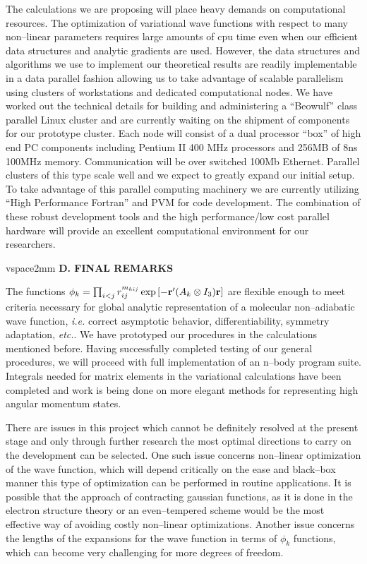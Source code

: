 The calculations we are proposing will place heavy demands on computational
resources. The optimization of variational wave functions with
respect to many non--linear parameters requires large amounts of
cpu time even when our efficient data structures and analytic gradients
are used. However, the data structures and algorithms we use to implement
our theoretical results are readily implementable in a data parallel fashion
allowing us to take advantage of scalable  parallelism using clusters
of workstations and dedicated computational nodes. We have worked out
the technical details for building and administering
a ``Beowulf''\cite{beowulfwww} class
parallel Linux cluster and are currently waiting on the shipment of
components for our prototype cluster. Each node
will consist of a dual processor ``box'' of high end
PC components including Pentium II 400 MHz processors and
256MB of 8ns 100MHz memory. Communication will be over
switched 100Mb Ethernet. Parallel clusters of this type
scale well and we expect to greatly expand our initial setup.
To take advantage of this parallel computing machinery we are  currently
utilizing ``High Performance Fortran'' \cite{HPFwww}
and PVM \cite{PVMwww} for code development. The combination of these
robust development tools and the high performance/low cost parallel hardware
will provide an excellent computational environment for our researchers.


vspace{2mm}
\noindent
{\bf D. FINAL REMARKS}

The functions $\phi _k = 
\prod_{i<j}r_{ij}^{m_{kij}}\exp \left[ -{\bf r}^{\prime%
}(A_k\otimes I_3){\bf r}\right]$
are flexible enough to meet criteria necessary for global analytic
representation of a molecular non--adiabatic wave function, {\it i.e.} 
correct
asymptotic behavior, differentiability, symmetry adaptation, {\it etc.}. 
We have prototyped our procedures in the calculations mentioned before. 
Having successfully completed testing of our general procedures, we will
proceed with full implementation of an 
n--body program suite. 
Integrals needed for matrix elements in
the variational calculations have been 
completed and work is being done on
more elegant methods for representing 
high angular momentum states.

There are issues in this project which cannot be definitely
resolved at the present stage and only through further research 
the most optimal directions to carry on the development can be
selected. One such issue concerns non--linear optimization of the
wave function, which will depend 
critically on the ease and black--box
manner this type of optimization 
can be performed in routine applications.
It is possible that the approach of 
contracting gaussian functions,
as it is done in the electron structure theory 
or an even--tempered scheme 
would be the most
effective way of avoiding costly non--linear optimizations.
Another issue concerns the lengths of the expansions for the
wave function in terms of $\phi_k$
functions, which can become very challenging for more degrees
of freedom.



